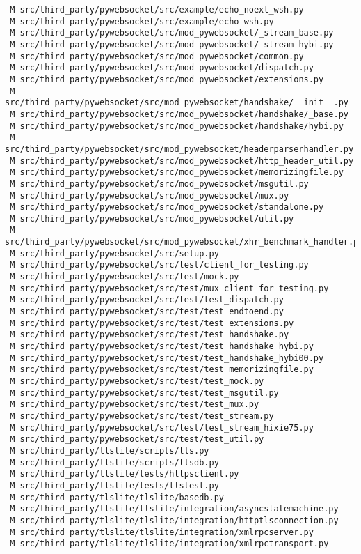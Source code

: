 \documentclass{article}
\begin{document}
\begin{verbatim}
 M src/third_party/pywebsocket/src/example/echo_noext_wsh.py
 M src/third_party/pywebsocket/src/example/echo_wsh.py
 M src/third_party/pywebsocket/src/mod_pywebsocket/_stream_base.py
 M src/third_party/pywebsocket/src/mod_pywebsocket/_stream_hybi.py
 M src/third_party/pywebsocket/src/mod_pywebsocket/common.py
 M src/third_party/pywebsocket/src/mod_pywebsocket/dispatch.py
 M src/third_party/pywebsocket/src/mod_pywebsocket/extensions.py
 M src/third_party/pywebsocket/src/mod_pywebsocket/handshake/__init__.py
 M src/third_party/pywebsocket/src/mod_pywebsocket/handshake/_base.py
 M src/third_party/pywebsocket/src/mod_pywebsocket/handshake/hybi.py
 M src/third_party/pywebsocket/src/mod_pywebsocket/headerparserhandler.py
 M src/third_party/pywebsocket/src/mod_pywebsocket/http_header_util.py
 M src/third_party/pywebsocket/src/mod_pywebsocket/memorizingfile.py
 M src/third_party/pywebsocket/src/mod_pywebsocket/msgutil.py
 M src/third_party/pywebsocket/src/mod_pywebsocket/mux.py
 M src/third_party/pywebsocket/src/mod_pywebsocket/standalone.py
 M src/third_party/pywebsocket/src/mod_pywebsocket/util.py
 M src/third_party/pywebsocket/src/mod_pywebsocket/xhr_benchmark_handler.py
 M src/third_party/pywebsocket/src/setup.py
 M src/third_party/pywebsocket/src/test/client_for_testing.py
 M src/third_party/pywebsocket/src/test/mock.py
 M src/third_party/pywebsocket/src/test/mux_client_for_testing.py
 M src/third_party/pywebsocket/src/test/test_dispatch.py
 M src/third_party/pywebsocket/src/test/test_endtoend.py
 M src/third_party/pywebsocket/src/test/test_extensions.py
 M src/third_party/pywebsocket/src/test/test_handshake.py
 M src/third_party/pywebsocket/src/test/test_handshake_hybi.py
 M src/third_party/pywebsocket/src/test/test_handshake_hybi00.py
 M src/third_party/pywebsocket/src/test/test_memorizingfile.py
 M src/third_party/pywebsocket/src/test/test_mock.py
 M src/third_party/pywebsocket/src/test/test_msgutil.py
 M src/third_party/pywebsocket/src/test/test_mux.py
 M src/third_party/pywebsocket/src/test/test_stream.py
 M src/third_party/pywebsocket/src/test/test_stream_hixie75.py
 M src/third_party/pywebsocket/src/test/test_util.py
 M src/third_party/tlslite/scripts/tls.py
 M src/third_party/tlslite/scripts/tlsdb.py
 M src/third_party/tlslite/tests/httpsclient.py
 M src/third_party/tlslite/tests/tlstest.py
 M src/third_party/tlslite/tlslite/basedb.py
 M src/third_party/tlslite/tlslite/integration/asyncstatemachine.py
 M src/third_party/tlslite/tlslite/integration/httptlsconnection.py
 M src/third_party/tlslite/tlslite/integration/xmlrpcserver.py
 M src/third_party/tlslite/tlslite/integration/xmlrpctransport.py

\end{verbatim}
\end{document}
